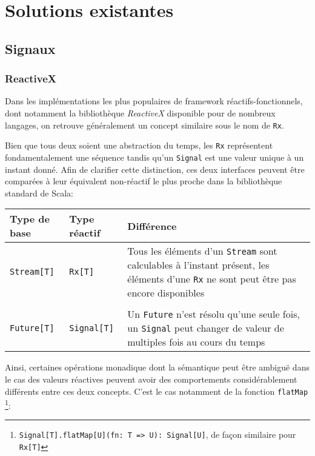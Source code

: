 \chapter{Solutions existantes}

\section{Signaux}

\subsection{ReactiveX}

Dans les implémentations les plus populaires de framework réactifs-fonctionnels, dont notamment la bibliothèque \emph{ReactiveX} disponible pour de nombreux langages, on retrouve généralement un concept similaire sous le nom de \texttt{Rx}.

Bien que tous deux soient une abstraction du temps, les \texttt{Rx} représentent fondamentalement une séquence tandis qu'un \texttt{Signal} est une valeur unique à un instant donné. Afin de clarifier cette distinction, ces deux interfaces peuvent être comparées à leur équivalent non-réactif le plus proche dans la bibliothèque standard de Scala:

\begin{table}[H]
	\begin{tabular}{@{}p{2.5cm}p{2.5cm}p{\dimexpr\textwidth-6cm\relax}@{}}
		\toprule
		Type de base & Type réactif & Différence \\ \midrule
		\texttt{Stream[T]} & \texttt{Rx[T]} & Tous les éléments d'un \texttt{Stream} sont calculables à l'instant présent, les éléments d'une \texttt{Rx} ne sont peut être pas encore disponibles \\
		&  & \\
		\texttt{Future[T]} & \texttt{Signal[T]} & Un \texttt{Future} n'est résolu qu'une seule fois, un \texttt{Signal} peut changer de valeur de multiples fois au cours du temps \\ \bottomrule
	\end{tabular}
\end{table}

Ainsi, certaines opérations monadique dont la sémantique peut être ambiguë dans le cas des valeurs réactives peuvent avoir des comportements considérablement différents entre ces deux concepts. C'est le cas notamment de la fonction \texttt{flatMap}
\footnote{\texttt{Signal[T].flatMap[U](fn: T => U): Signal[U]}, de façon similaire pour \texttt{Rx[T]}}:

